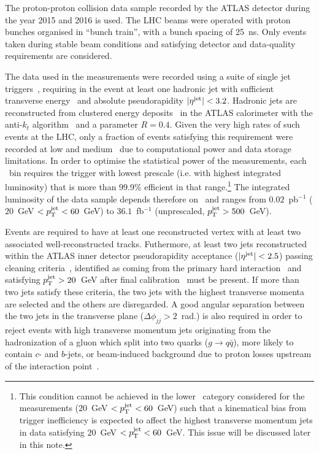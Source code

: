 The proton-proton collision data sample recorded by the ATLAS detector during the year 2015 and 2016 is used. The LHC beams were operated with proton bunches organised in ``bunch train'', with a bunch spacing of 25~ns. Only events taken during stable beam conditions and satisfying detector and data-quality requirements are considered. 

The data used in the measurements were recorded using a suite of single jet triggers~\cite{TRIG-2016-01}, requiring in the event at least one hadronic jet with sufficient transverse energy \ptjet\ and absolute pseudorapidity $|\eta^{\textrm{jet}}|<3.2$. Hadronic jets are reconstructed from clustered energy deposits~\cite{PERF-2014-07} in the ATLAS calorimeter with the anti-$k_t$ algorithm~\cite{anti_kt} and a parameter $R=0.4$. Given the very high rates of such events at the LHC, only a fraction of events satisfying this requirement were recorded at low and medium \ptjet\ due to computational power and data storage limitations. In order to optimise the statistical power of the measurements, each \ptjet\ bin requires the trigger with lowest prescale (i.e. with highest integrated luminosity) that is more than 99.9\% efficient in that range.\footnote{This condition cannot be achieved in the lower \ptjet\ category considered for the measurements ($20$~GeV $<p_{\mathrm{T}}^{\textrm{jet}}<60$~GeV) such that a kinematical bias from trigger inefficiency is expected to affect the highest transverse momentum jets in data satisfying $20$~GeV $<p_{\mathrm{T}}^{\textrm{jet}}<60$~GeV. This issue will be discussed later in this note.}  The integrated luminosity of the data sample depends therefore on \ptjet\ and ranges from $0.02$~pb$^{-1}$ ($20$~GeV $<p_{\mathrm{T}}^{\textrm{jet}}<60$~GeV) to $36.1$~fb$^{-1}$ (unprescaled, $p_{\mathrm{T}}^{\textrm{jet}}>500$~GeV).

Events are required to have at least one reconstructed vertex with at least two associated well-reconstructed tracks. Futhermore, at least two jets reconstructed within the ATLAS inner detector pseudorapidity acceptance ($|\eta^{\textrm{jet}}|<2.5$) passing cleaning criteria~\cite{ATLAS-CONF-2015-029}, identified as coming from the primary hard interaction~\cite{ATLAS-CONF-2014-018} and satisfying $p_{\mathrm{T}}^{\textrm{jet}}>20$~GeV after final calibration~\cite{PERF-2016-04} must be present. If more than two jets satisfy these criteria, the two jets with the highest transverse momenta are selected and the others are disregarded. A good angular separation between the two jets in the transverse plane ($\Delta\phi_{jj}>2$~rad.) is also required in order to reject events with high transverse momentum jets originating from the hadronization of a gluon which split into two quarks ($g\rightarrow q\bar{q}$), more likely to contain $c$- and $b$-jets, or beam-induced background due to proton losses upstream of the interaction point~\cite{DAPR-2012-01}. 

